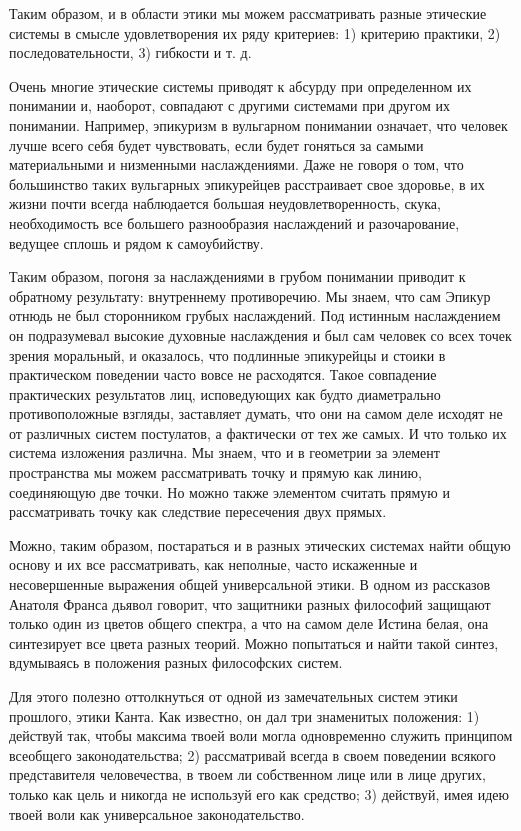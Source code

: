Таким образом, и в области этики мы можем рассматривать разные
этические системы в смысле удовлетворения их ряду критериев: 1)
критерию практики, 2) последовательности, 3) гибкости и т. д.

Очень многие этические системы приводят к абсурду при определенном их
понимании и, наоборот, совпадают с другими системами при другом их
понимании. Например, эпикуризм в вульгарном понимании означает, что
человек лучше всего себя будет чувствовать, если будет гоняться за
самыми материальными и низменными наслаждениями. Даже не говоря о том,
что большинство таких вульгарных эпикурейцев расстраивает свое
здоровье, в их жизни почти всегда наблюдается большая
неудовлетворенность, скука, необходимость все большего разнообразия
наслаждений и разочарование, ведущее сплошь и рядом к самоубийству.

Таким образом, погоня за наслаждениями в грубом понимании приводит к
обратному результату: внутреннему противоречию. Мы знаем, что сам
Эпикур отнюдь не был сторонником грубых наслаждений. Под истинным
наслаждением он подразумевал высокие духовные наслаждения и был сам
человек со всех точек зрения моральный, и оказалось, что подлинные
эпикурейцы и стоики в практическом поведении часто вовсе не
расходятся. Такое совпадение практических результатов лиц,
исповедующих как будто диаметрально противоположные взгляды,
заставляет думать, что они на самом деле исходят не от различных
систем постулатов, а фактически от тех же самых. И что только их
система изложения различна. Мы знаем, что и в геометрии за элемент
пространства мы можем рассматривать точку и прямую как линию,
соединяющую две точки. Но можно также элементом считать прямую и
рассматривать точку как следствие пересечения двух прямых.

Можно, таким образом, постараться и в разных этических системах найти
общую основу и их все рассматривать, как неполные, часто искаженные и
несовершенные выражения общей универсальной этики. В одном из
рассказов Анатоля Франса дьявол говорит, что защитники разных
философий защищают только один из цветов общего спектра, а что на
самом деле Истина белая, она синтезирует все цвета разных теорий.
Можно попытаться и найти такой синтез, вдумываясь в положения разных
философских систем.

Для этого полезно оттолкнуться от одной из замечательных систем этики
прошлого, этики Канта. Как известно, он дал три знаменитых положения:
1) действуй так, чтобы максима твоей воли могла одновременно служить
принципом всеобщего законодательства; 2) рассматривай всегда в своем
поведении всякого представителя человечества, в твоем ли собственном
лице или в лице других, только как цель и никогда не используй его как
средство; 3) действуй, имея идею твоей воли как универсальное
законодательство.

